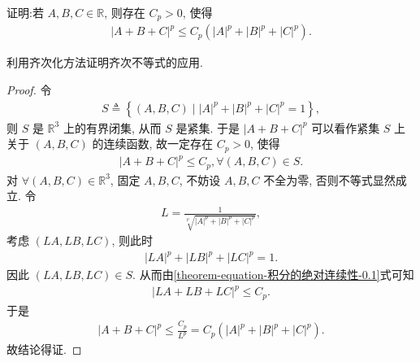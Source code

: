 \documentclass[../../main.tex]{subfiles}
\begin{document}
\begin{lemma}\label{lemma:齐次化方法应用(三元p次方)}
证明:若 $A,B,C\in \mathbb{R}$, 则存在 $C_p>0$, 使得
\begin{align*}
|A + B + C|^p \leqslant C_p(|A|^p + |B|^p + |C|^p).
\end{align*}
\end{lemma}
\begin{note}
利用齐次化方法证明齐次不等式的应用.
\end{note}
\begin{proof}
令
\begin{align*}
S \triangleq \left\{ (A,B,C) \mid |A|^p + |B|^p + |C|^p = 1 \right\},
\end{align*}
则 $S$ 是 $\mathbb{R}^3$ 上的有界闭集, 从而 $S$ 是紧集. 于是 $|A + B + C|^p$ 可以看作紧集 $S$ 上关于 $(A,B,C)$ 的连续函数, 故一定存在 $C_p > 0$, 使得
\begin{align}
|A + B + C|^p \leqslant C_p, \forall (A,B,C) \in S. \label{theorem-equation-积分的绝对连续性-0.1}
\end{align}
对 $\forall (A,B,C) \in \mathbb{R}^3$, 固定 $A,B,C$, 不妨设 $A,B,C$ 不全为零, 否则不等式显然成立. 令
\begin{align*}
L = \frac{1}{\sqrt[p]{|A|^p + |B|^p + |C|^p}},
\end{align*}
考虑 $(LA,LB,LC)$, 则此时
\begin{align*}
|LA|^p + |LB|^p + |LC|^p = 1.
\end{align*}
因此 $(LA,LB,LC) \in S$. 从而由\eqref{theorem-equation-积分的绝对连续性-0.1}式可知
\begin{align*}
|LA + LB + LC|^p \leqslant C_p.
\end{align*}
于是
\begin{align*}
|A + B + C|^p \leqslant \frac{C_p}{L^p} = C_p(|A|^p + |B|^p + |C|^p).
\end{align*}
故结论得证. 
\end{proof}
\end{document}
